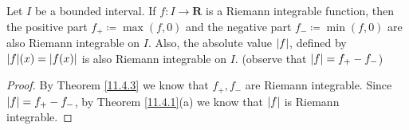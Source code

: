 \begin{corollary}\label{11.4.4}
    \quad
    Let \(I\) be a bounded interval.
    If \(f : I \to \mathbf{R}\) is a Riemann integrable function, then the positive part \(f_+ \coloneqq \max(f, 0)\) and the negative part \(f_- \coloneqq \min(f, 0)\) are also Riemann integrable on \(I\).
    Also, the absolute value \(\abs*{f}\), defined by \(\abs*{f}(x) = \abs*{f(x)}\) is also Riemann integrable on \(I\).
    (observe that \(\abs*{f} = f_+ - f_-\))
\end{corollary}

\begin{proof}
    By Theorem \ref{11.4.3} we know that \(f_+, f_-\) are Riemann integrable.
    Since \(\abs*{f} = f_+ - f_-\), by Theorem \ref{11.4.1}(a) we know that \(\abs*{f}\) is Riemann integrable.
\end{proof}